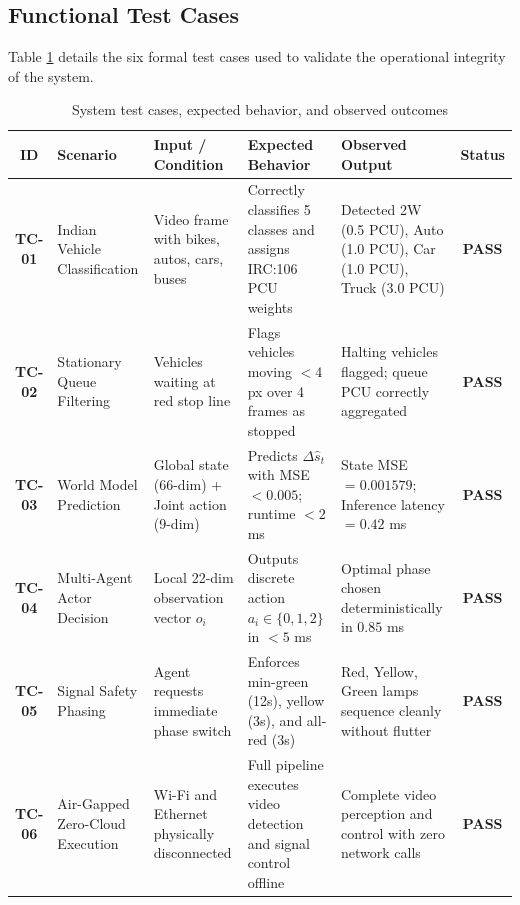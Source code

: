 \subsection{Functional Test Cases}
Table \ref{tab:ch4_test_cases} details the six formal test cases used to validate the operational integrity of the system.

\begin{table}[htbp]
\centering
\scriptsize
\setlength{\tabcolsep}{3pt}
\caption{System test cases, expected behavior, and observed outcomes}
\label{tab:ch4_test_cases}
\begin{tabularx}{\textwidth}{|c|p{2.2cm}|p{2.6cm}|p{2.8cm}|p{3.2cm}|c|}
\hline
\textbf{ID} & \textbf{Scenario} & \textbf{Input / Condition} & \textbf{Expected Behavior} & \textbf{Observed Output} & \textbf{Status} \\ \hline
\textbf{TC-01} & Indian Vehicle Classification & Video frame with bikes, autos, cars, buses & Correctly classifies 5 classes and assigns IRC:106 PCU weights & Detected 2W (0.5 PCU), Auto (1.0 PCU), Car (1.0 PCU), Truck (3.0 PCU) & \textbf{PASS} \\ \hline
\textbf{TC-02} & Stationary Queue Filtering & Vehicles waiting at red stop line & Flags vehicles moving $< 4$ px over 4 frames as stopped & Halting vehicles flagged; queue PCU correctly aggregated & \textbf{PASS} \\ \hline
\textbf{TC-03} & World Model Prediction & Global state (66-dim) + Joint action (9-dim) & Predicts $\Delta \hat{s}_t$ with MSE $< 0.005$; runtime $< 2$ ms & State MSE $= 0.001579$; Inference latency $= 0.42$ ms & \textbf{PASS} \\ \hline
\textbf{TC-04} & Multi-Agent Actor Decision & Local 22-dim observation vector $o_i$ & Outputs discrete action $a_i \in \{0, 1, 2\}$ in $< 5$ ms & Optimal phase chosen deterministically in $0.85$ ms & \textbf{PASS} \\ \hline
\textbf{TC-05} & Signal Safety Phasing & Agent requests immediate phase switch & Enforces min-green (12s), yellow (3s), and all-red (3s) & Red, Yellow, Green lamps sequence cleanly without flutter & \textbf{PASS} \\ \hline
\textbf{TC-06} & Air-Gapped Zero-Cloud Execution & Wi-Fi and Ethernet physically disconnected & Full pipeline executes video detection and signal control offline & Complete video perception and control with zero network calls & \textbf{PASS} \\ \hline
\end{tabularx}
\end{table}

